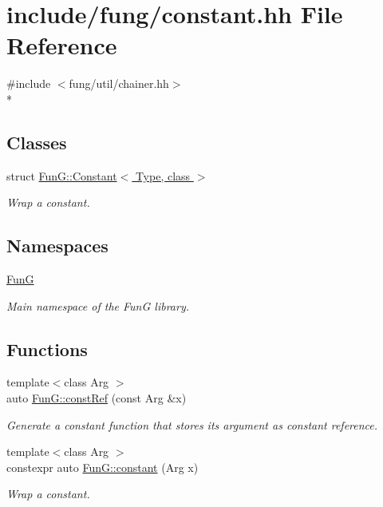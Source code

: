 \hypertarget{constant_8hh}{\section{include/fung/constant.hh File Reference}
\label{constant_8hh}
}
{\ttfamily \#include $<$fung/util/chainer.\-hh$>$}\\*
\subsection*{Classes}
\begin{DoxyCompactItemize}
\item 
struct \hyperlink{structFunG_1_1Constant}{Fun\-G\-::\-Constant$<$ Type, class $>$}
\begin{DoxyCompactList}\small\item\em Wrap a constant. \end{DoxyCompactList}\end{DoxyCompactItemize}
\subsection*{Namespaces}
\begin{DoxyCompactItemize}
\item 
\hyperlink{namespaceFunG}{Fun\-G}
\begin{DoxyCompactList}\small\item\em Main namespace of the Fun\-G library. \end{DoxyCompactList}\end{DoxyCompactItemize}
\subsection*{Functions}
\begin{DoxyCompactItemize}
\item 
{\footnotesize template$<$class Arg $>$ }\\auto \hyperlink{namespaceFunG_abcfb38c2e995436816ea884803302f2d}{Fun\-G\-::const\-Ref} (const Arg \&x)
\begin{DoxyCompactList}\small\item\em Generate a constant function that stores its argument as constant reference. \end{DoxyCompactList}\item 
{\footnotesize template$<$class Arg $>$ }\\constexpr auto \hyperlink{namespaceFunG_a939d13d36c194b402715f12a28147cdc}{Fun\-G\-::constant} (Arg x)
\begin{DoxyCompactList}\small\item\em Wrap a constant. \end{DoxyCompactList}\end{DoxyCompactItemize}
